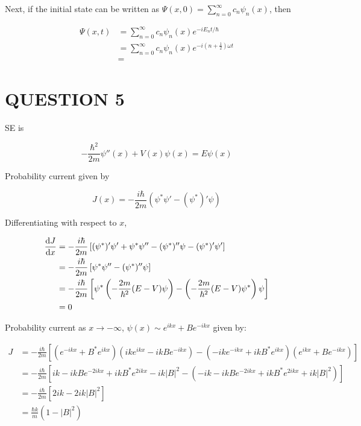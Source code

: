 \documentclass[a4paper]{article}
\begin{document}
Next, if the initial state can be written as $ \Psi(x,0) = \sum_{n=0}^{\infty} c_{n} \psi_{n}(x)  $, then

\begin{align*}
\Psi(x,t) & = \sum_{n=0}^{\infty} c_{n} \psi_{n}(x) e^{-iE_{n}t / \hbar} \\
& = \sum_{n=0}^{\infty} c_{n} \psi_{n}(x) e^{-i(n + \frac{1}{2}) \omega t} \\
& = 
\end{align*}



\section{QUESTION 5}

SE is

\[ - \frac{\hbar^{2}}{2m} \psi''(x) + V(x) \psi(x) = E \psi(x) \]

Probability current given by

\[ J(x) = - \frac{i \hbar }{2m} (\psi^{*} \psi' - (\psi^{*})' \psi )  \]

Differentiating with respect to $ x $,

\begin{align*}
\frac{\mathrm{d} J}{\mathrm{d} x}  & = - \frac{i \hbar }{2m}\left[ (\psi^{*})'\psi' + \psi^{*} \psi'' - (\psi^{*})'' \psi - (\psi^{*})' \psi'  \right]     \\
& =  - \frac{i \hbar }{2m}\left[ \psi^{*} \psi'' - (\psi^{*})'' \psi \right]     \\
& = - \frac{i \hbar }{2m}\left[ \psi^{*} \left(  - \frac{2m}{\hbar^{2}}(E - V) \psi \right)  - \left(  - \frac{2m}{\hbar^{2}}(E - V) \psi^{*} \right) \psi \right] \\
& = 0
\end{align*}

Probability current as $ x \to - \infty $, $ \psi(x) \sim e^{ikx} + Be^{-ikx} $ given by:

\begin{align*}
J & = - \frac{i \hbar }{2m} \left[   ( e^{-ikx} + B^{*} e^{ikx} )(ik e^{ikx} - i k B e^{-ikx}  )       - ( - i k e^{-i k x} + i k B^{*} e^{ikx}    )   ( e^{ikx} + Be^{-ikx}) \right] \\
& = - \frac{i \hbar }{2m} \left[  ik - ikBe^{-2ikx} + ikB^{*} e^{2ikx} - i k | B |^{2}  - \left(  - ik - ik B e^{-2ikx} + i k B^{*} e^{2ikx} + i k | B |^{2}     \right)    \right] \\
& = - \frac{i \hbar }{2m} \left[  2ik  - 2i k | B |^{2}    \right] \\
& =  \frac{\hbar k}{m} ( 1  - | B |^{2} )
\end{align*}
\end{document}
